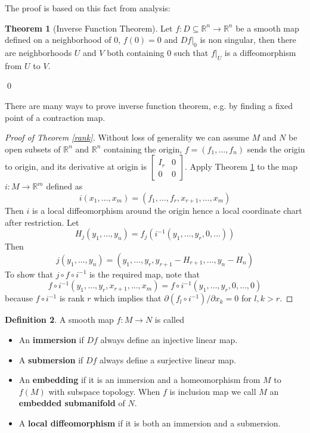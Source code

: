 \documentclass{article}
\theoremstyle{definition}
\newtheorem{thm}{Theorem}[section]
\newtheorem{dfn}[thm]{Definition}
\begin{document}
The proof is based on this fact from analysis:

\begin{thm}[Inverse Function Theorem]\label{inv}
    Let $f: D\subseteq \mathbb{R}^n\rightarrow \mathbb{R}^n$ be a smooth map defined on a neighborhood of $0$, $f(0)=0$ and $Df|_0$ is non singular, then there are neighborhoods $U$ and $V$ both containing $0$ such that $f|_U$ is a diffeomorphism from $U$ to $V$.
\end{thm}\qed

There are many ways to prove inverse function theorem, e.g. by finding a fixed point of a contraction map.\\

\begin{proof}[Proof of Theorem \ref{rank}]
    Without loss of generality we can assume $M$ and $N$ be open subsets of $\mathbb{R}^n$ and $\mathbb{R}^n$ containing the origin, $f=(f_1, \dots, f_n)$ sends the origin to origin, and its derivative at origin is $\left[\begin{array}{cc} I_r & 0\\ 0 & 0\end{array}\right]$. Apply Theorem \ref{inv} to the map $i: M\rightarrow \mathbb{R}^m$ defined as 
    \[i(x_1, \dots, x_m)=(f_1, \dots, f_r, x_{r+1}, \dots, x_m)\]
    Then $i$ is a local diffeomorphism around the origin hence a local coordinate chart after restriction. Let 
    \[H_j(y_1, \dots, y_n)=f_j(i^{-1}(y_1, \dots, y_r, 0, \dots))\]
    Then 
    \[j(y_1, \dots, y_n)=(y_1, \dots, y_r, y_{r+1}-H_{r+1}, \dots, y_n-H_n)\]
    To show that $j\circ f\circ i^{-1}$ is the required map, note that 
    \[f\circ i^{-1}(y_1, \dots, y_r, x_{r+1}, \dots,  x_m)=f\circ i^{-1}(y_1, \dots, y_r, 0, \dots, 0)\]
    because $f\circ i^{-1}$ is rank $r$ which implies that $\partial (f_l\circ i^{-1})/\partial x_k=0$ for $l, k>r$.
\end{proof}

\begin{dfn}
    A smooth map $f: M\rightarrow N$ is called
    \begin{itemize}
        \item An {\bf immersion} if $Df$ always define an injective linear map.
        \item A {\bf submersion} if $Df$ always define a surjective linear map.
        \item An {\bf embedding} if it is an immersion and a homeomorphism from $M$ to $f(M)$ with subspace topology. When $f$ is inclusion map we call $M$ an {\bf embedded submanifold} of $N$.
        \item A {\bf local diffeomorphism} if it is both an immersion and a submersion.
    \end{itemize}
\end{dfn}
\end{document}
